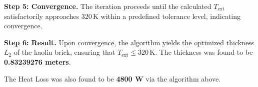 \documentclass[12pt]{article}
\begin{document}
\textbf{Step 5: Convergence.} The iteration proceeds until the calculated \(T_{\text{ext}}\) satisfactorily approaches \(320 \, \text{K}\) within a predefined tolerance level, indicating convergence.
\newline

\textbf{Step 6: Result.} Upon convergence, the algorithm yields the optimized thickness \(L_2\) of the kaolin brick, ensuring that \(T_{\text{ext}} \leq 320 \, \text{K}\). The thickness was found to be \textbf{0.83239276 meters}.

The Heat Loss was also found to be \textbf{4800 W} via the algorithm above.
\end{document}
